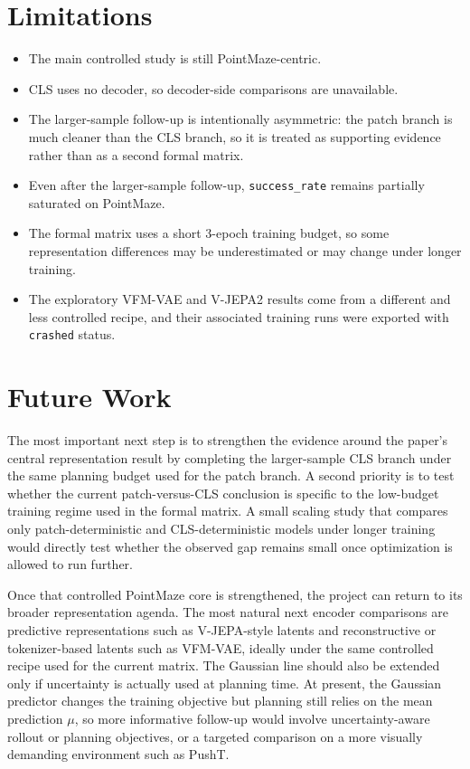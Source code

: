 \documentclass[11pt]{article}
\begin{document}
\section{Limitations}
\begin{itemize}
\item The main controlled study is still PointMaze-centric.
\item CLS uses no decoder, so decoder-side comparisons are unavailable.
\item The larger-sample follow-up is intentionally asymmetric: the patch branch is much cleaner than the CLS branch, so it is treated as supporting evidence rather than as a second formal matrix.
\item Even after the larger-sample follow-up, \texttt{success\_rate} remains partially saturated on PointMaze.
\item The formal matrix uses a short \(3\)-epoch training budget, so some representation differences may be underestimated or may change under longer training.
\item The exploratory VFM-VAE and V-JEPA2 results come from a different and less controlled recipe, and their associated training runs were exported with \texttt{crashed} status.
\end{itemize}

\section{Future Work}
The most important next step is to strengthen the evidence around the paper's central representation result by completing the larger-sample CLS branch under the same planning budget used for the patch branch. A second priority is to test whether the current patch-versus-CLS conclusion is specific to the low-budget training regime used in the formal matrix. A small scaling study that compares only patch-deterministic and CLS-deterministic models under longer training would directly test whether the observed gap remains small once optimization is allowed to run further.

Once that controlled PointMaze core is strengthened, the project can return to its broader representation agenda. The most natural next encoder comparisons are predictive representations such as V-JEPA-style latents and reconstructive or tokenizer-based latents such as VFM-VAE, ideally under the same controlled recipe used for the current matrix. The Gaussian line should also be extended only if uncertainty is actually used at planning time. At present, the Gaussian predictor changes the training objective but planning still relies on the mean prediction \(\mu\), so more informative follow-up would involve uncertainty-aware rollout or planning objectives, or a targeted comparison on a more visually demanding environment such as PushT.
\end{document}
